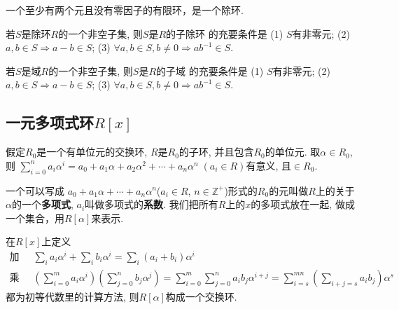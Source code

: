 \begin{Proposition}
一个至少有两个元且没有零因子的有限环，是一个除环.
\end{Proposition}

\begin{Theorem}
若$S$是除环$R$的一个非空子集, 则$S$是$R$的子除环 的充要条件是 (1) $S$有非零元; (2) $a, b \in S \Rightarrow a-b \in S$; (3) $\forall a, b \in S, b \neq 0 \Rightarrow ab^{-1} \in S$.
\end{Theorem}

\begin{Theorem}
若$S$是域$R$的一个非空子集, 则$S$是$R$的子域 的充要条件是 (1) $S$有非零元; (2) $a, b \in S \Rightarrow a-b \in S$; (3) $\forall a, b \in S, b \neq 0 \Rightarrow ab^{-1} \in S$.
\end{Theorem}


\subsection{一元多项式环$R[x]$} %
\begin{Note}
假定$R_0$是一个有单位元的交换环, $R$是$R_0$的子环, 并且包含$R_0$的单位元. 取$\alpha \in R_0$, 则
$ \displaystyle \sum_{i=0}^n a_i \alpha^i = a_0 + a_1 \alpha + a_2 \alpha^2 + \cdots + a_n \alpha^n\; (a_i \in R) $有意义, 且$\in R_0$.
\end{Note}

\begin{Definition}[多项式]
一个可以写成 $ a_0 + a_1 \alpha + \cdots + a_n \alpha^n $($a_i \in R$, $n \in \mathbb{Z}^+ $)形式的$R_0$的元叫做$R$上的关于$\alpha$的一个\textbf{多项式}, $a_i$叫做多项式的\textbf{系数}. 我们把所有$R$上的$x$的多项式放在一起, 做成一个集合，用$R[\alpha]$来表示.
\end{Definition}

\begin{Note}[环上的多项式构成一个环]
在$R[x]$上定义
$$
\begin{aligned}
\text{加法: }& \sum\limits_i a_i \alpha^i + \sum\limits_i b_i \alpha^i = \sum\limits_i (a_i + b_i) \alpha^i \\
\text{乘法: }& \displaystyle \left(\sum_{i=0}^m a_i \alpha^i \right) \left( \sum_{j=0}^{n} b_j \alpha^j \right) 
= \sum\limits_{i=0}^m \sum\limits_{j=0}^{n} a_i b_j \alpha^{i+j}
= \sum_{i=s}^{mn} \left(\sum_{i+j=s} a_i b_{j} \right) \alpha^s
\end{aligned}
$$
 都为初等代数里的计算方法, 则$R[\alpha]$构成一个交换环.
\end{Note}

